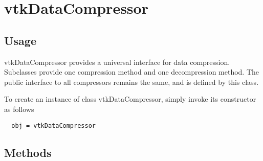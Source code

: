 \section{vtkDataCompressor}

\subsection{Usage}

 vtkDataCompressor provides a universal interface for data
 compression.  Subclasses provide one compression method and one
 decompression method.  The public interface to all compressors
 remains the same, and is defined by this class.

To create an instance of class vtkDataCompressor, simply
invoke its constructor as follows
\begin{verbatim}
  obj = vtkDataCompressor
\end{verbatim}
\subsection{Methods}

